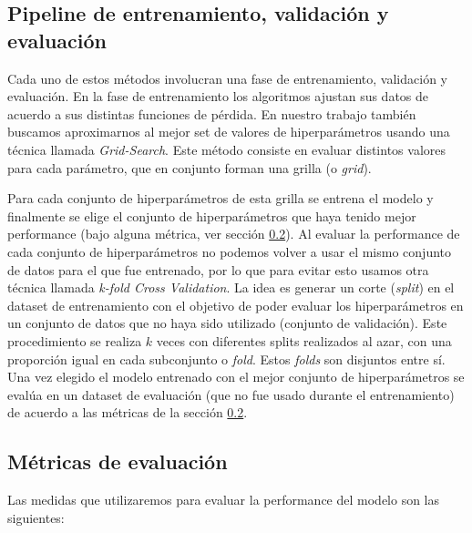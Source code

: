 \subsection{Pipeline de entrenamiento, validación y evaluación} \label{pipeline}

Cada uno de estos métodos involucran una fase de entrenamiento, validación y evaluación. En la fase de entrenamiento los algoritmos ajustan sus datos de acuerdo a sus distintas funciones de pérdida. En nuestro trabajo también buscamos aproximarnos al mejor set de valores de hiperparámetros usando una técnica llamada \textit{Grid-Search}. Este método consiste en evaluar distintos valores para cada parámetro, que en conjunto forman una grilla (o \textit{grid}). 

Para cada conjunto de hiperparámetros de esta grilla se entrena el modelo y finalmente se elige el conjunto de hiperparámetros que haya tenido mejor performance (bajo alguna métrica, ver sección \ref{eval_metrics}). Al evaluar la performance de cada conjunto de hiperparámetros no podemos volver a usar el mismo conjunto de datos para el que fue entrenado, por lo que para evitar esto usamos otra técnica llamada \textit{k-fold Cross Validation}. La idea es generar un corte (\textit{split}) en el dataset de entrenamiento con el objetivo de poder evaluar los hiperparámetros en un conjunto de datos que no haya sido utilizado (conjunto de validación). Este procedimiento se realiza $k$ veces con diferentes splits realizados al azar, con una proporción igual en cada subconjunto o \textit{fold}. Estos \textit{folds} son disjuntos entre sí. Una vez elegido el modelo entrenado con el mejor conjunto de hiperparámetros se evalúa en un dataset de evaluación (que no fue usado durante el entrenamiento) de acuerdo a las métricas de la sección \ref{eval_metrics}.


\subsection{Métricas de evaluación} \label{eval_metrics}

Las medidas que utilizaremos para evaluar la performance del modelo son las siguientes:

